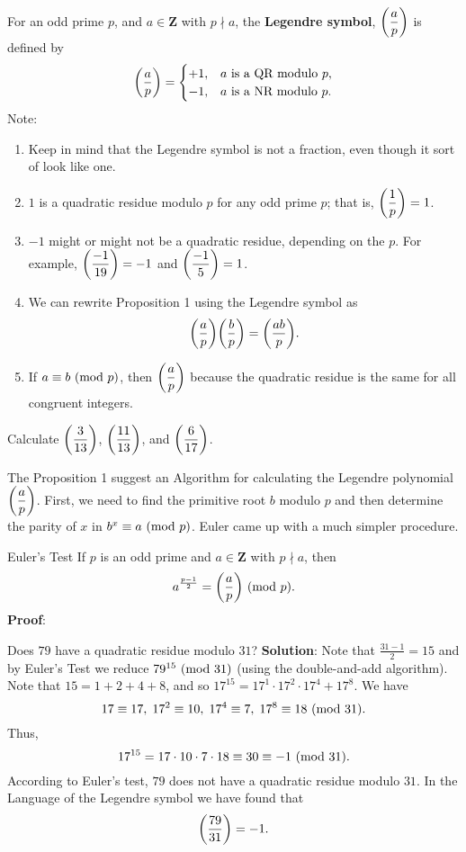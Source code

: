 For an odd prime $ p $, and $ a\in\mathbf{Z} $ with $ p\nmid a $, the \textbf{Legendre symbol},
$ \biggl(\dfrac{a}{p}\biggr) $ is defined by
\[ \biggl(\dfrac{a}{p}\biggr)=\begin{cases}
        +1, & \text{$a$ is a $\text{QR}$ modulo $ p $}, \\
        -1, & \text{$a$ is a $\text{NR}$ modulo $ p $}.
    \end{cases} \]
Note:
\begin{enumerate}[(1)]
    \item Keep in mind that the Legendre symbol is not a fraction, even though it
          sort of look like one.
    \item $ 1 $ is a quadratic residue modulo $ p $ for any odd prime $ p $; that is, $ \biggl(\dfrac{1}{p}\biggr)=1 $.
    \item $ -1 $ might or might not be a quadratic residue, depending on the $ p $. For example,
          $ \biggl(\dfrac{-1}{19}\biggr)=-1 $ and $ \biggl(\dfrac{-1}{5}\biggr)=1 $.
    \item We can rewrite Proposition 1 using the Legendre symbol as
          \[ \biggl(\dfrac{a}{p}\biggr)\biggl(\dfrac{b}{p}\biggr)=\biggl(\dfrac{ab}{p}\biggr). \]
    \item If $ a\equiv b\ (\mathrm{mod}\ p) $, then $ \biggl(\dfrac{a}{p}\biggr) $ because the quadratic residue is the same for all congruent integers.
\end{enumerate}
\begin{Exercise}{}{}
    Calculate $ \biggl(\dfrac{3}{13}\biggr) $, $\biggl(\dfrac{11}{13}\biggr)$, and $ \biggl(\dfrac{6}{17}\biggr) $.
\end{Exercise}
The Proposition 1 suggest an Algorithm for calculating the Legendre polynomial $ \biggl(\dfrac{a}{p}\biggr) $.
First, we need to find the primitive root $b$ modulo $p$ and then determine
the parity of $x$ in $ b^x\equiv a\ (\mathrm{mod}\ p) $. Euler came up with a much simpler procedure.
\begin{Proposition}{Euler's Test}{}
    If $ p $ is an odd prime and $ a\in\mathbf{Z} $ with $ p\nmid a $, then
    \[ a^{\frac{p-1}{2}}=\biggl(\dfrac{a}{p}\biggr)\ (\mathrm{mod}\ p). \]
    \tcblower{}
    \textbf{Proof}:
\end{Proposition}
\begin{Example}{}{}
    Does $ 79 $ have a quadratic residue modulo $ 31 $?
    \tcblower{}
    \textbf{Solution}: Note that $ \frac{31-1}{2}=15 $ and by Euler's Test we reduce $ 79^{15}\ (\mathrm{mod}\ 31) $ (using the double-and-add algorithm).
    Note that $ 15=1+2+4+8 $, and so $ 17^{15}=17^1\cdot 17^2\cdot 17^4+17^8 $. We have
    \[ 17\equiv 17,\; 17^2\equiv 10,\; 17^4\equiv 7,\; 17^8\equiv 18\ (\mathrm{mod}\ 31). \]
    Thus,
    \[ 17^{15}=17\cdot 10\cdot 7\cdot 18\equiv 30\equiv -1\ (\mathrm{mod}\ 31). \]
    According to Euler's test, $79$ does not have a quadratic residue modulo $31$. In the
    Language of the Legendre symbol we have found that
    \[ \biggl(\dfrac{79}{31}\biggr)=-1. \]
\end{Example}